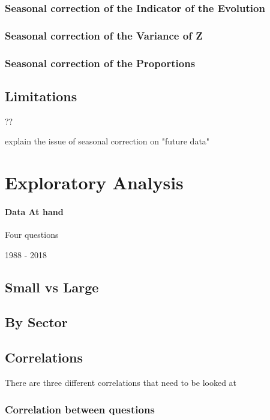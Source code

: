 \documentclass[12pt,a4paper,oneside]{book}
\begin{document}
\subsection*{Seasonal correction of the Indicator of the Evolution}

\subsection*{Seasonal correction of the Variance of Z}

\subsection*{Seasonal correction of the Proportions}

\section{Limitations}
 ?? 
 
explain the issue of seasonal correction on "future data" 



\chapter{Exploratory Analysis}


\subsubsection{Data At hand}

Four questions

1988 - 2018

\section{Small vs Large}


\section{By Sector}

\section{Correlations}

There are three different correlations that need to be looked at

\subsection{Correlation between questions}
\end{document}
